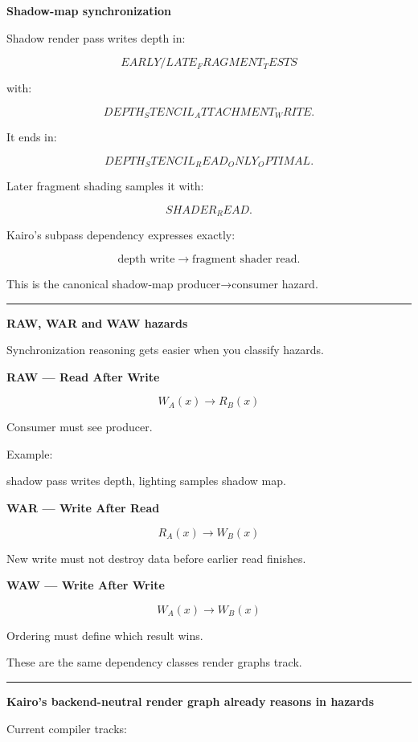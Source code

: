 \textbf{Shadow-map synchronization}

Shadow render pass writes depth in:

\[
EARLY/LATE_FRAGMENT_TESTS
\]

with:

\[
DEPTH_STENCIL_ATTACHMENT_WRITE.
\]

It ends in:

\[
DEPTH_STENCIL_READ_ONLY_OPTIMAL.
\]

Later fragment shading samples it with:

\[
SHADER_READ.
\]

Kairo's subpass dependency expresses exactly:

\[
\text{depth write}
\rightarrow
\text{fragment shader read}.
\]

This is the canonical shadow-map producer→consumer hazard.

\begin{center}\rule{0.5\linewidth}{0.5pt}\end{center}

\textbf{RAW, WAR and WAW hazards}

Synchronization reasoning gets easier when you classify hazards.

\textbf{RAW --- Read After Write}

\[
W_A(x)
\rightarrow
R_B(x)
\]

Consumer must see producer.

Example:

shadow pass writes depth, lighting samples shadow map.

\textbf{WAR --- Write After Read}

\[
R_A(x)
\rightarrow
W_B(x)
\]

New write must not destroy data before earlier read finishes.

\textbf{WAW --- Write After Write}

\[
W_A(x)
\rightarrow
W_B(x)
\]

Ordering must define which result wins.

These are the same dependency classes render graphs track.

\begin{center}\rule{0.5\linewidth}{0.5pt}\end{center}

\textbf{Kairo's backend-neutral render graph already reasons in hazards}

Current  compiler tracks:

